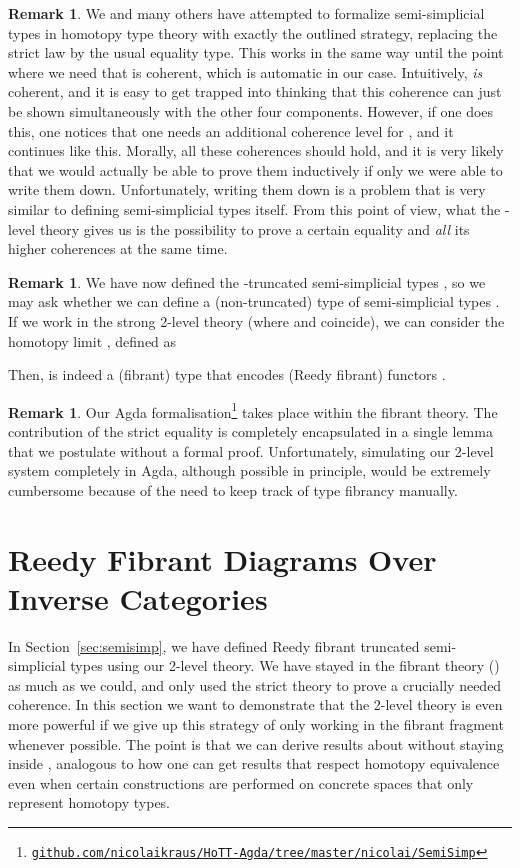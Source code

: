 \documentclass[a4paper,reqno]{amsart}
\theoremstyle{plain}
\theoremstyle{definition}
\newtheorem{remark}[theorem]{Remark}
\begin{document}
\begin{remark}
 We and many others have attempted to formalize semi-simplicial types in homotopy type theory with exactly the outlined strategy, replacing the strict law  by the usual equality type.
 This works in the same way until the point where we need that  is coherent, which is automatic in our case.
 Intuitively,  \emph{is} coherent, and it is easy to get trapped into thinking that this coherence can just be shown simultaneously with the other four components.
 However, if one does this, one notices that one needs an additional coherence level for ,
 and it continues like this.
 Morally, all these coherences should hold, and it is very likely that we would actually be able to prove them inductively if only we were able to write them down.
 Unfortunately, writing them down is a problem that is very similar to defining semi-simplicial types itself.
 From this point of view, what the -level theory gives us is the possibility to prove a certain equality and \emph{all} its higher coherences at the same time. 
\end{remark}
\begin{remark}
 We have now defined the -truncated semi-simplicial types , so we may ask whether we can define a (non-truncated) type of semi-simplicial types .
 If we work in the strong 2-level theory (where  and  coincide), 
 we can consider the homotopy limit , defined as
  
 Then,  is indeed a (fibrant) type that encodes (Reedy fibrant) functors .
\end{remark}
\begin{remark}
 Our Agda formalisation\footnote{\href{https://github.com/nicolaikraus/HoTT-Agda/blob/master/nicolai/SemiSimp/SStypes.agda}{\nolinkurl{github.com/nicolaikraus/HoTT-Agda/tree/master/nicolai/SemiSimp}}} takes place within the fibrant theory. 
 The contribution of the strict equality is completely encapsulated in a single lemma that we postulate without a formal proof.
 Unfortunately, simulating our 2-level system completely in Agda, although possible in principle, would be extremely cumbersome because of the need to keep track of type fibrancy manually. 
\end{remark}


\section{Reedy Fibrant Diagrams Over Inverse Categories} \label{sec:diag-inverse}

In Section~\ref{sec:semisimp}, we have defined Reedy fibrant truncated semi-simplicial types using our 2-level theory.
We have stayed in the fibrant theory () as much as we could, and only used the strict theory to prove a crucially needed coherence. 
In this section we want to demonstrate that the 2-level theory is even more powerful if we give up this strategy of only working in the fibrant fragment whenever possible.
The point is that we can derive results about  without staying inside , 
analogous to how one can get results that respect homotopy equivalence even when certain constructions are performed on concrete spaces that only represent homotopy types.
\end{document}
